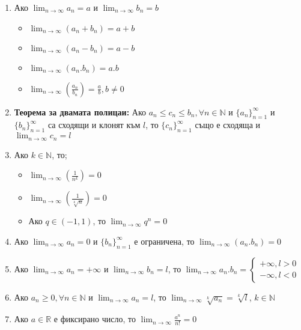 \documentclass[11pt,oneside,a4paper]{article}
\begin{document}
\begin{enumerate}
    \item Ако \(\displaystyle \lim_{n \to \infty} a_n = a\) и \(\displaystyle \lim_{n \to \infty} b_n = b\)
    \begin{itemize}
        \item \(\displaystyle \lim_{n \to \infty} (a_n + b_n) = a + b\)
        \item \(\displaystyle \lim_{n \to \infty} (a_n - b_n) = a - b\)
        \item \(\displaystyle \lim_{n \to \infty} (a_n . b_n) = a.b\)
        \item \(\displaystyle \lim_{n \to \infty} (\frac{a_n}{b_n}) = \frac{a}{b}, b \neq 0\)
    \end{itemize}
    \item \textbf{Теорема за двамата полицаи: } Ако \(a_n \leq c_n \leq b_n, \forall n \in \mathbb{N}\) и \(\{a_n\}^\infty_{n=1}\) и \(\{b_n\}^\infty_{n=1}\) са сходящи и клонят към \(l\), то \(\{c_n\}^{\infty}_{n=1}\) също е сходяща и \(\displaystyle \lim_{n \to \infty} c_n = l\)
    \item Ако \(k \in \mathbb{N}\), то;
    \begin{itemize}
        \item \(\displaystyle \lim_{n \to \infty} (\frac{1}{n^k}) = 0\)
        \item \(\displaystyle \lim_{n \to \infty} (\frac{1}{\sqrt[k]{n}}) = 0\)
        \item Ако \(q \in (-1, 1)\), то \(\displaystyle \lim_{n \to \infty} q^n = 0\)
    \end{itemize}
    \item Ако \(\displaystyle \lim_{n \to \infty} a_n = 0\) и \(\{b_n\}^{\infty}_{n=1}\) е ограничена, то \(\displaystyle \lim_{n \to \infty} (a_n . b_n) = 0\)
    \item Ако \(\displaystyle \lim_{n \to \infty} a_n = +\infty\) и \(\displaystyle \lim_{n \to \infty} b_n = l\), то \(\displaystyle \lim_{n \to \infty} a_n.b_n = \begin{cases} +\infty, l > 0 \\ -\infty, l < 0\end{cases}\)
    \item Ако \(a_n \geq 0, \forall n \in \mathbb{N}\) и \(\displaystyle \lim_{n \to \infty} a_n = l\), то \(\displaystyle \lim_{n \to \infty} \sqrt[k]{a_n} = \sqrt[k]{l}\), \(k \in \mathbb{N}\)
    \item Ако \(a \in \mathbb{R}\) е фиксирано число, то \(\displaystyle \lim_{n \to \infty} \frac{a^n}{n!} = 0\)

\end{enumerate}
\end{document}
